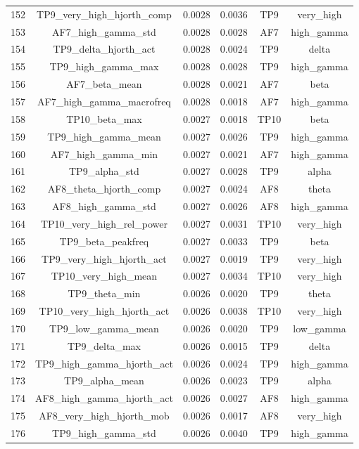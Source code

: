 \begin{table}[hptb]
\begin{table}
\begin{tabular}{cccccc}
152 & TP9_very_high_hjorth_comp & 0.0028 & 0.0036 & TP9 & very_high \\
153 & AF7_high_gamma_std & 0.0028 & 0.0028 & AF7 & high_gamma \\
154 & TP9_delta_hjorth_act & 0.0028 & 0.0024 & TP9 & delta \\
155 & TP9_high_gamma_max & 0.0028 & 0.0028 & TP9 & high_gamma \\
156 & AF7_beta_mean & 0.0028 & 0.0021 & AF7 & beta \\
157 & AF7_high_gamma_macrofreq & 0.0028 & 0.0018 & AF7 & high_gamma \\
158 & TP10_beta_max & 0.0027 & 0.0018 & TP10 & beta \\
159 & TP9_high_gamma_mean & 0.0027 & 0.0026 & TP9 & high_gamma \\
160 & AF7_high_gamma_min & 0.0027 & 0.0021 & AF7 & high_gamma \\
161 & TP9_alpha_std & 0.0027 & 0.0028 & TP9 & alpha \\
162 & AF8_theta_hjorth_comp & 0.0027 & 0.0024 & AF8 & theta \\
163 & AF8_high_gamma_std & 0.0027 & 0.0026 & AF8 & high_gamma \\
164 & TP10_very_high_rel_power & 0.0027 & 0.0031 & TP10 & very_high \\
165 & TP9_beta_peakfreq & 0.0027 & 0.0033 & TP9 & beta \\
166 & TP9_very_high_hjorth_act & 0.0027 & 0.0019 & TP9 & very_high \\
167 & TP10_very_high_mean & 0.0027 & 0.0034 & TP10 & very_high \\
168 & TP9_theta_min & 0.0026 & 0.0020 & TP9 & theta \\
169 & TP10_very_high_hjorth_act & 0.0026 & 0.0038 & TP10 & very_high \\
170 & TP9_low_gamma_mean & 0.0026 & 0.0020 & TP9 & low_gamma \\
171 & TP9_delta_max & 0.0026 & 0.0015 & TP9 & delta \\
172 & TP9_high_gamma_hjorth_act & 0.0026 & 0.0024 & TP9 & high_gamma \\
173 & TP9_alpha_mean & 0.0026 & 0.0023 & TP9 & alpha \\
174 & AF8_high_gamma_hjorth_act & 0.0026 & 0.0027 & AF8 & high_gamma \\
175 & AF8_very_high_hjorth_mob & 0.0026 & 0.0017 & AF8 & very_high \\
176 & TP9_high_gamma_std & 0.0026 & 0.0040 & TP9 & high_gamma \\

\end{tabular}
\end{table}
\end{table}
